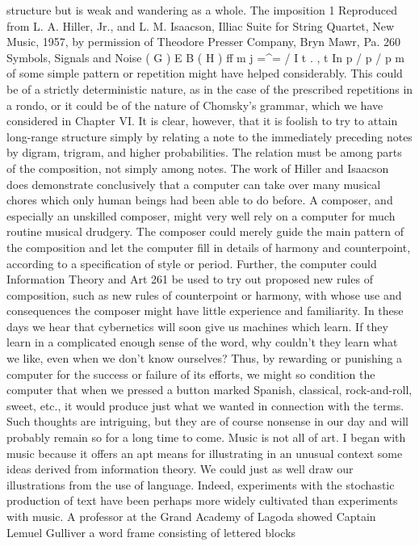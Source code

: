 {{{{{{{{{{{{structure but is weak and wandering as a whole. The imposition
1 Reproduced from L. A. Hiller, Jr., and L. M. Isaacson, Illiac Suite for String
Quartet, New Music, 1957, by permission of Theodore Presser Company, Bryn
Mawr, Pa.
260 Symbols, Signals and Noise
( G ) E B ( H )
ff
m j =^=
/
I t . , t In p
/ p
/ p
m
of some simple pattern or repetition might have helped considerably.
This could be of a strictly deterministic nature, as in the case
of the prescribed repetitions in a rondo, or it could be of the nature
of Chomsky’s grammar, which we have considered in Chapter VI.
It is clear, however, that it is foolish to try to attain long-range
structure simply by relating a note to the immediately preceding
notes by digram, trigram, and higher probabilities. The relation
must be among parts of the composition, not simply among notes.
The work of Hiller and Isaacson does demonstrate conclusively
that a computer can take over many musical chores which only
human beings had been able to do before. A composer, and
especially an unskilled composer, might very well rely on a computer
for much routine musical drudgery. The composer could
merely guide the main pattern of the composition and let the
computer fill in details of harmony and counterpoint, according
to a specification of style or period. Further, the computer could
Information Theory and Art
261
be used to try out proposed new rules of composition, such as new
rules of counterpoint or harmony, with whose use and consequences
the composer might have little experience and familiarity.
In these days we hear that cybernetics will soon give us machines
which learn. If they learn in a complicated enough sense of the
word, why couldn’t they learn what we like, even when we don’t
know ourselves? Thus, by rewarding or punishing a computer for
the success or failure of its efforts, we might so condition the computer
that when we pressed a button marked Spanish, classical,
rock-and-roll, sweet, etc., it would produce just what we wanted
in connection with the terms. Such thoughts are intriguing, but
they are of course nonsense in our day and will probably remain
so for a long time to come.
Music is not all of art. I began with music because it offers an
apt means for illustrating in an unusual context some ideas derived
from information theory. We could just as well draw our illustrations
from the use of language. Indeed, experiments with the
stochastic production of text have been perhaps more widely
cultivated than experiments with music.
A professor at the Grand Academy of Lagoda showed Captain
Lemuel Gulliver a word frame consisting of lettered blocks
}}}}}}}}}}}}
